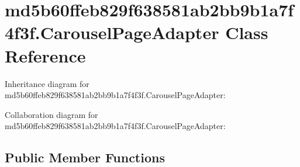 \hypertarget{classmd5b60ffeb829f638581ab2bb9b1a7f4f3f_1_1_carousel_page_adapter}{}\section{md5b60ffeb829f638581ab2bb9b1a7f4f3f.\+Carousel\+Page\+Adapter Class Reference}
\label{classmd5b60ffeb829f638581ab2bb9b1a7f4f3f_1_1_carousel_page_adapter}


Inheritance diagram for md5b60ffeb829f638581ab2bb9b1a7f4f3f.\+Carousel\+Page\+Adapter\+:


Collaboration diagram for md5b60ffeb829f638581ab2bb9b1a7f4f3f.\+Carousel\+Page\+Adapter\+:
\subsection*{Public Member Functions}
